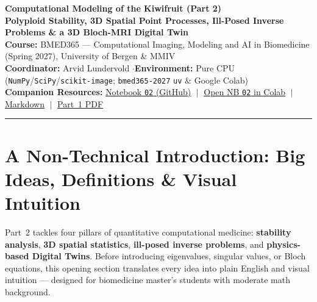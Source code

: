 \documentclass[10.5pt,a4paper]{article}
\begin{document}
\begin{tcolorbox}[enhanced, colback=uibblue!6, colframe=uibblue, boxrule=1.0pt, arc=3pt, left=10pt, right=10pt, top=9pt, bottom=9pt]
{\LARGE\bfseries\color{uibblue} Computational Modeling of the Kiwifruit (Part 2)}\\[3pt]
{\normalsize\bfseries Polyploid Stability, 3D Spatial Point Processes, Ill-Posed Inverse Problems \& a 3D Bloch-MRI Digital Twin}\\[3pt]
{\small \textbf{Course:} BMED365 --- Computational Imaging, Modeling and AI in Biomedicine (Spring 2027), University of Bergen \& MMIV\\
\textbf{Coordinator:} Arvid Lundervold \quad$\cdot$\quad \textbf{Environment:} Pure CPU (\texttt{NumPy}/\texttt{SciPy}/\texttt{scikit-image}; \texttt{bmed365-2027} \texttt{uv} \& Google Colab)\\[3pt]
\textbf{Companion Resources:} \href{https://github.com/arvidl/BMED365-2027/blob/main/Lab5-Comp-Mod/Kiwi-challenge/notebooks/02-kiwi-digital-twin-and-inverse-problems.ipynb}{Notebook \texttt{02} (GitHub)} $\;\vert\;$ \href{https://colab.research.google.com/github/arvidl/BMED365-2027/blob/main/Lab5-Comp-Mod/Kiwi-challenge/notebooks/02-kiwi-digital-twin-and-inverse-problems.ipynb}{Open NB \texttt{02} in Colab} $\;\vert\;$ \href{https://github.com/arvidl/BMED365-2027/blob/main/Lab5-Comp-Mod/Kiwi-challenge/docs/inverse-problems-and-digital-twin.md}{Markdown} $\;\vert\;$ \href{https://github.com/arvidl/BMED365-2027/blob/main/Lab5-Comp-Mod/Kiwi-challenge/docs/foundations-atlas-and-morphogenesis.pdf}{Part~1 PDF}}
\end{tcolorbox}

\vspace{-2pt}
{\small\tableofcontents}
\vspace{4pt}
\hrule
\vspace{6pt}

\section{A Non-Technical Introduction: Big Ideas, Definitions \& Visual Intuition}

\begin{infobox}
Part~2 tackles four pillars of quantitative computational medicine: \textbf{stability analysis}, \textbf{3D spatial statistics}, \textbf{ill-posed inverse problems}, and \textbf{physics-based Digital Twins}. Before introducing eigenvalues, singular values, or Bloch equations, this opening section translates every idea into plain English and visual intuition --- designed for biomedicine master's students with moderate math background.
\end{infobox}
\end{document}

